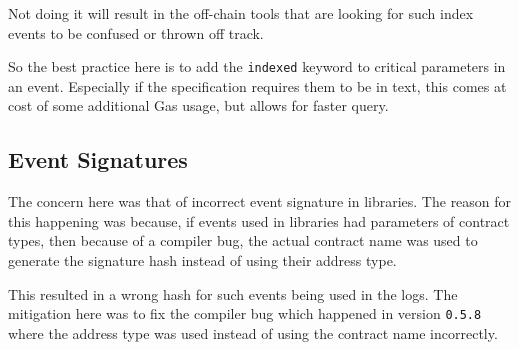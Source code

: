Not doing it will result in the off-chain tools that are looking for
such index events to be confused or thrown off track.

So the best practice here is to add the \texttt{indexed} keyword to
critical parameters in an event. Especially if the specification
requires them to be in text, this comes at cost of some additional Gas
usage, but allows for faster query.

\subsection{Event Signatures}\label{event-signatures}

The concern here was that of incorrect event signature in libraries. The
reason for this happening was because, if events used in libraries had
parameters of contract types, then because of a compiler bug, the actual
contract name was used to generate the signature hash instead of using
their address type.

This resulted in a wrong hash for such events being used in the logs.
The mitigation here was to fix the compiler bug which happened in
version \texttt{0.5.8} where the address type was used instead of using
the contract name incorrectly.
